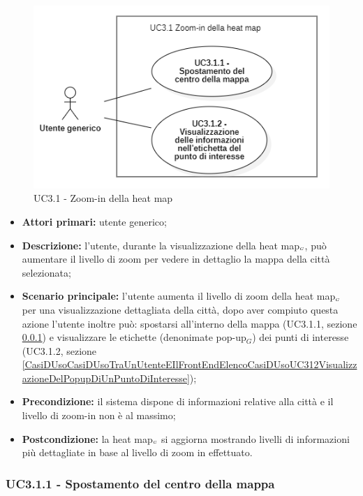 \begin{center}
	\begin{figure}[H]
		\centering\includegraphics[scale=0.8]{../immagini/attori_casi/UC3.1.png}
		\caption{UC3.1 - Zoom-in della heat map}
	\end{figure}
\end{center}

\begin{itemize}
	\item \textbf{Attori primari:} utente generico;
	\item \textbf{Descrizione:} l’utente, durante la visualizzazione della heat map$_{\scaleto{G}{3pt}}$, può aumentare il livello di zoom per vedere in dettaglio la mappa della città selezionata;
	\item \textbf{Scenario principale:} l’utente aumenta il livello di zoom della heat map$_{\scaleto{G}{3pt}}$ per una visualizzazione dettagliata della città, dopo aver compiuto questa azione l'utente inoltre può: spostarsi all'interno della mappa (UC3.1.1, sezione \ref{CasiDUsoCasiDUsoTraUnUtenteEIlFrontEndElencoCasiDUsoUC311SpostamentoDelCentroDellaMappa}) e visualizzare le etichette (denonimate pop-up$_G$) dei punti di interesse (UC3.1.2, sezione \ref{CasiDUsoCasiDUsoTraUnUtenteEIlFrontEndElencoCasiDUsoUC312VisualizzazioneDelPopupDiUnPuntoDiInteresse});
	\item \textbf{Precondizione:} il sistema dispone di informazioni relative alla città e il livello di zoom-in non è al massimo;
	\item \textbf{Postcondizione:} la heat map$_{\scaleto{G}{3pt}}$ si aggiorna mostrando livelli di informazioni più dettagliate in base al livello di zoom in effettuato.
\end{itemize}

\subsubsection{UC3.1.1 - Spostamento del centro della mappa}\label{CasiDUsoCasiDUsoTraUnUtenteEIlFrontEndElencoCasiDUsoUC311SpostamentoDelCentroDellaMappa}

